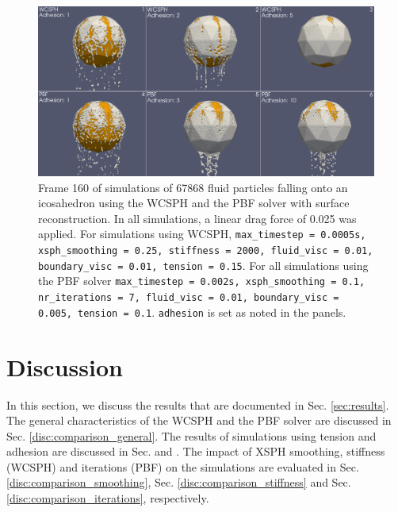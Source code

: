 \documentclass[11pt, letterpaper, twocolumn]{article}
\begin{document}
\begin{figure}
  \centering
  \includegraphics[width=\textwidth]{images/adhesion.0160.png}
  \caption{Frame 160 of simulations of 67868 fluid particles falling onto an icosahedron using the WCSPH and the PBF solver with surface reconstruction. In all simulations, a linear drag force of 0.025 was applied. For simulations using WCSPH, \texttt{max\_timestep = 0.0005s,
  xsph\_smoothing = 0.25, stiffness = 2000, fluid\_visc = 0.01, boundary\_visc = 0.01, tension = 0.15}. For all simulations using the PBF solver \texttt{max\_timestep = 0.002s, xsph\_smoothing = 0.1, nr\_iterations = 7, fluid\_visc = 0.01, boundary\_visc = 0.005, tension = 0.1}. \texttt{adhesion} is set as noted in the panels.}
  \label{fig:adhesion}
\end{figure}

\section{Discussion}
\label{sec:discussion}
In this section, we discuss the results that are documented in Sec. \ref{sec:results}. The general characteristics of the WCSPH and the PBF solver are discussed in Sec. \ref{disc:comparison_general}. The results of simulations using tension and adhesion are discussed in Sec. \label{disc:comparison_tension} and \label{disc:comparison_adhesion}.
The impact of XSPH smoothing, stiffness (WCSPH) and iterations (PBF) on the simulations are evaluated in Sec. \ref{disc:comparison_smoothing}, Sec. \ref{disc:comparison_stiffness} and Sec. \ref{disc:comparison_iterations}, respectively.
\end{document}
